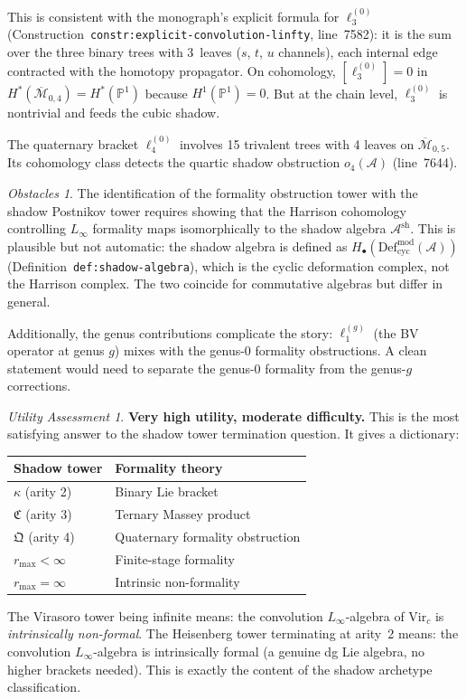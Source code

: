 \documentclass[11pt]{article}
\theoremstyle{definition}
\theoremstyle{remark}
\newtheorem*{assessment}{Utility Assessment}
\newtheorem*{obstacle}{Obstacles}
\newcommand{\Mbar}{\overline{\mathcal{M}}}
\newcommand{\Def}{\mathrm{Def}}
\newcommand{\Vir}{\mathrm{Vir}}
\newcommand{\cA}{\mathcal{A}}
\begin{document}
This is consistent with the monograph's explicit formula for
$\ell_3^{(0)}$
(Construction~\texttt{constr:explicit-convolution-linfty},
line~7582): it is the sum over the three binary trees with
3~leaves ($s$, $t$, $u$ channels), each internal edge contracted
with the homotopy propagator.  On cohomology,
$[\ell_3^{(0)}] = 0$ in $H^*(\Mbar_{0,4}) = H^*(\mathbb{P}^1)$
because $H^1(\mathbb{P}^1) = 0$.  But at the chain level,
$\ell_3^{(0)}$ is nontrivial and feeds the cubic shadow.

The quaternary bracket $\ell_4^{(0)}$ involves 15 trivalent trees
with 4 leaves on $\Mbar_{0,5}$.  Its cohomology class detects the
quartic shadow obstruction $o_4(\cA)$ (line~7644).

\begin{obstacle}
The identification of the formality obstruction tower with the
shadow Postnikov tower requires showing that the Harrison
cohomology controlling $L_\infty$ formality maps isomorphically to
the shadow algebra $\cA^{\mathrm{sh}}$.  This is plausible but not
automatic: the shadow algebra is defined as
$H_\bullet(\Def_{\mathrm{cyc}}^{\mathrm{mod}}(\cA))$
(Definition~\texttt{def:shadow-algebra}), which is the cyclic
deformation complex, not the Harrison complex.  The two coincide
for commutative algebras but differ in general.

Additionally, the genus contributions complicate the story:
$\ell_1^{(g)}$ (the BV operator at genus $g$) mixes with the
genus-0 formality obstructions.  A clean statement would need to
separate the genus-0 formality from the genus-$g$ corrections.
\end{obstacle}

\begin{assessment}
\textbf{Very high utility, moderate difficulty.}  This is the most
satisfying answer to the shadow tower termination question.  It
gives a dictionary:
\begin{center}
\begin{tabular}{ll}
\hline
\textbf{Shadow tower} & \textbf{Formality theory} \\
\hline
$\kappa$ (arity 2) & Binary Lie bracket \\
$\mathfrak{C}$ (arity 3) & Ternary Massey product \\
$\mathfrak{Q}$ (arity 4) & Quaternary formality obstruction \\
$r_{\max} < \infty$ & Finite-stage formality \\
$r_{\max} = \infty$ & Intrinsic non-formality \\
\hline
\end{tabular}
\end{center}
The Virasoro tower being infinite means: the convolution
$L_\infty$-algebra of $\Vir_c$ is \emph{intrinsically non-formal}.
The Heisenberg tower terminating at arity~2 means: the convolution
$L_\infty$-algebra is intrinsically formal (a genuine dg Lie
algebra, no higher brackets needed).  This is exactly the
content of the shadow archetype classification.
\end{assessment}
\end{document}
